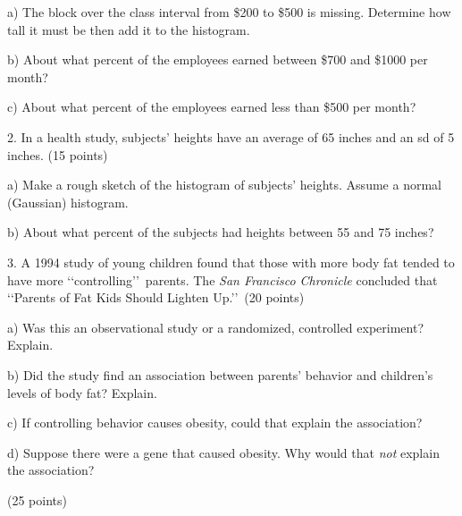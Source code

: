 \documentclass[10pt]{article}
\begin{document}
\hspace{10pt} a) The block
over the class interval from \$200 to \$500 is missing.
Determine how tall it must be then add it to the 
histogram.
\vspace{2.7in}

\hspace{10pt} b) About what percent of the employees earned between \$700 and \$1000 per month?
\vspace{1.75in}

\hspace{10pt} c) About what percent of the employees earned less than \$500 per month?
\vfill
\eject

2. In a health study, subjects' heights have an average of  65 inches and an sd of 5 inches.
(15 points)

\hspace{10pt} a) Make a rough sketch of the histogram of subjects' heights.
Assume a normal (Gaussian) histogram.
\vspace{1.5in}

\hspace{10pt} b) About what percent of the subjects had heights between
55 and 75 inches?  
\vspace{2in}

3. A 1994 study of young children found that those with more body fat tended to have
more \lq\lq controlling\rq\rq\ parents.  The \textit{San Francisco Chronicle}  
concluded that \lq\lq Parents of Fat Kids Should Lighten Up.\rq\rq\ (20 points)

\hspace{10pt} a) Was this an observational study or a randomized, controlled experiment?
Explain.
\vspace{.9in}

\hspace{10pt} b) Did the study find an association between parents' behavior
and children's levels of body fat?  Explain.
\vspace{.7in}

\hspace{10pt} c) If controlling behavior causes obesity, could that explain the association?
\vspace{1in}


\hspace{10pt} d) Suppose there were a gene that caused obesity. Why would that \textit{not} explain
the association? 


\vfill
\eject

(25 points)
\end{document}
